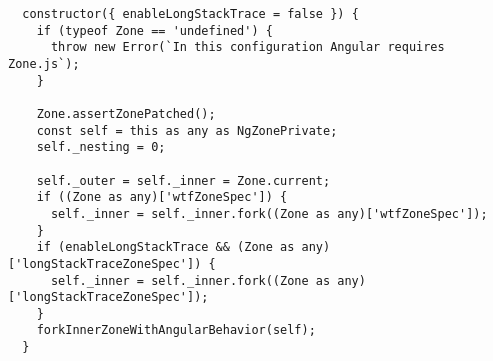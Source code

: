 \begin{verbatim}
  constructor({ enableLongStackTrace = false }) {
    if (typeof Zone == 'undefined') {
      throw new Error(`In this configuration Angular requires Zone.js`);
    }

    Zone.assertZonePatched();
    const self = this as any as NgZonePrivate;
    self._nesting = 0;

    self._outer = self._inner = Zone.current;
    if ((Zone as any)['wtfZoneSpec']) {
      self._inner = self._inner.fork((Zone as any)['wtfZoneSpec']);
    }
    if (enableLongStackTrace && (Zone as any)['longStackTraceZoneSpec']) {
      self._inner = self._inner.fork((Zone as any)['longStackTraceZoneSpec']);
    }
    forkInnerZoneWithAngularBehavior(self);
  }
\end{verbatim}
